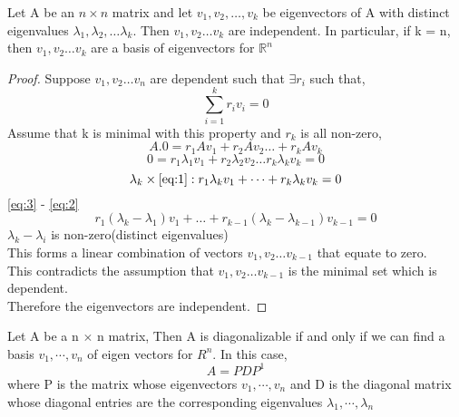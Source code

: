 \documentclass[twoside]{report}
\begin{document}
\begin{theorem}
   Let A be an $n \times n$ matrix and let $v_1,v_2,\dots,v_k$ be eigenvectors of A with distinct eigenvalues $\lambda_1, \lambda_2,\dots\lambda_k$. Then $v_1,v_2\dots v_k$ are independent. In particular, if k = n, then $v_1,v_2\dots v_k$ are a basis of eigenvectors for $\mathbb{R}^n$
\end{theorem}
\begin{proof}
	Suppose $v_1,v_2\dots v_n$ are dependent such that $\exists r_i$  such that,
	\begin{equation}
	    \sum_{i=1}^{k} r_i v_i = 0
		\label{eq:1}
	\end{equation}
	Assume that k is minimal with this property and $r_k$ is all non-zero,
	\[
		A.0 = r_1 A v_1 + r_2 A v_2 \dots + r_k A v_k
	\]
	\begin{equation}
	0 = r_1\lambda_1 v_1 + r_2 \lambda_2 v_2 \dots r_k \lambda_k v_k = 0	
		\label{eq:2}
	\end{equation}
	\begin{equation}
	   \lambda_k \times \ref{eq:1}: r_1 \lambda_k v_1 + \dots + r_k \lambda_k v_k = 0	
		\label{eq:3}
	\end{equation}
	\ref{eq:3} - \ref{eq:2}
	\[
	   r_1(\lambda_k - \lambda_1)v_1 + \dots + r_{k-1}(\lambda_k - \lambda_{k-1})v_{k-1} = 0
	\]
	$\lambda_k - \lambda_i$ is non-zero(distinct eigenvalues)\\
	This forms a linear combination of vectors $v_1,v_2\dots v_{k-1}$ that equate to zero. \\
	This contradicts the assumption that $v_1,v_2\dots v_{k-1}$ is the minimal set which is dependent. \\
	Therefore the eigenvectors are independent.
     \end{proof}
\begin{theorem}
   Let A be a n $\times$ n matrix, Then A is diagonalizable if and only if we can find a basis $v_{1},\cdots, v_{n}$ of eigen vectors for $R^{n}$. In this case,
   \begin{equation}
      A = PDP^{1}	
   \end{equation}
   where P is the matrix whose eigenvectors $v_{1},\cdots, v_{n}$ and D is the diagonal matrix whose diagonal entries are the corresponding eigenvalues $\lambda_{1}, \cdots, \lambda_{n}$
\end{theorem}
\end{document}
